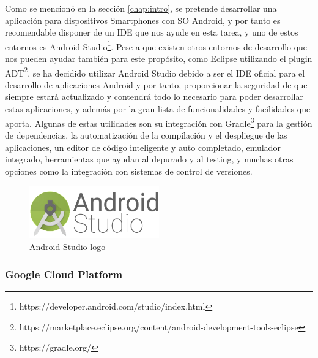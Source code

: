 Como se mencionó en la sección \ref{chap:intro}, se pretende desarrollar una aplicación para dispositivos Smartphones con \acs{SO} Android, y por tanto es recomendable disponer de un \acs{IDE} que nos ayude en esta tarea, y uno de estos entornos es Android Studio\footnote{https://developer.android.com/studio/index.html}. Pese a que existen otros entornos de desarrollo que nos pueden ayudar también para este propósito, como Eclipse utilizando el plugin \acs{ADT}\footnote{https://marketplace.eclipse.org/content/android-development-tools-eclipse}, se ha decidido utilizar Android Studio debido a ser el \acs{IDE} oficial para el desarrollo de aplicaciones Android y por tanto, proporcionar la seguridad de que siempre estará actualizado y contendrá todo lo necesario para poder desarrollar estas aplicaciones, y además por la gran lista de funcionalidades y facilidades que aporta. Algunas de estas utilidades son su integración con Gradle\footnote{https://gradle.org/} para la gestión de dependencias, la automatización de la compilación y el despliegue de las aplicaciones, un editor de código inteligente y auto completado, emulador integrado, herramientas que ayudan al depurado y al testing, y muchas otras opciones como la integración con sistemas de control de versiones.

\begin{figure}[!h]
\begin{center}
\includegraphics[width=0.5\textwidth]{./figures/android-studio.png}
\caption{Android Studio logo}
\label{fig:android-studio}
\end{center}
\end{figure}

\subsubsection{Google Cloud Platform}
\label{GCP}

